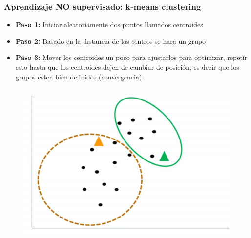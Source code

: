 \documentclass[10pt]{beamer}
\begin{document}
\begin{frame}
\frametitle{Aprendizaje NO supervisado: k-means clustering}
\begin{beamerboxesrounded}[upper=uppercolor, lower=lowercolor, shadow=true]{} 

\begin{itemize}
 \item \textbf{Paso 1:} Iniciar aleatoriamente dos puntos llamados centroides
 \item \textbf{Paso 2:} Basado en la distancia de los centros se har\'a un grupo
 \item \textbf{Paso 3:} Mover los centroides un poco para ajustarlos para optimizar, repetir esto hasta que los centroides dejen de cambiar de posici\'on, es decir que los grupos esten bien definidos (convergencia) 
   
\end{itemize}
\end{beamerboxesrounded}

\begin{columns}
\begin{column}{.5\textwidth}
 \begin{figure}
 \includegraphics[scale=0.25]{./Figures/centroids.png} 
 \end{figure}
\end{column}%


\end{columns}
\end{frame}
\end{document}
